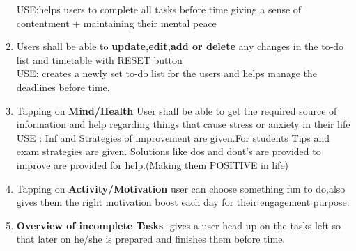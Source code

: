 \documentclass{article}
\begin{document}
\begin{enumerate}
USE:helps users to complete all tasks before time giving a sense of contentment + maintaining their mental peace
    \item Users shall be able to \textbf{update,edit,add or delete} any changes in the to-do list and timetable with RESET button\\
USE: creates a newly set to-do list for the users and helps manage the deadlines before time.
    \item Tapping on \textbf{ Mind/Health} User shall be able to get the required source of information and help regarding things that cause stress or anxiety in their life\\
USE : Inf and Strategies of improvement are given.For students Tips and exam strategies are given. Solutions like dos and dont's are provided to improve are provided for help.(Making them POSITIVE in life)
    \item Tapping on \textbf{Activity/Motivation} user can choose something fun to do,also gives them the right motivation boost each day for their engagement purpose.
    \item \textbf{Overview of incomplete Tasks}- gives a user head up on the tasks left so that later on he/she is prepared and finishes them before time. 
    

\end{enumerate}
\end{document}

